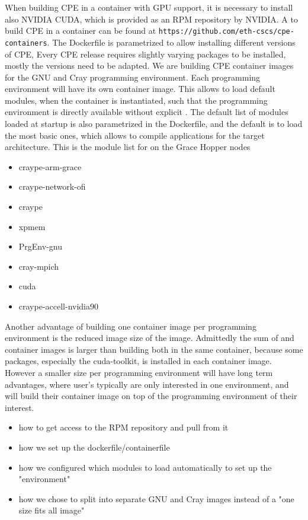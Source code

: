 When building CPE in a container with GPU support, it is necessary to install also NVIDIA CUDA, which is provided as an RPM repository by NVIDIA.
A  to build CPE in a container can be found at \lstinline{https://github.com/eth-cscs/cpe-containers}. The Dockerfile is parametrized to allow installing different versions of CPE,
Every CPE release requires slightly varying packages to be installed, mostly the versions need to be adapted.
We are building CPE container images for the GNU and Cray programming environment.
Each programming environment will have its own container image.
This allows to load default modules, when the container is instantiated, such that the programming environment is directly available without explicit .
The default list of modules loaded at startup is also parametrized in the Dockerfile, and the default is to load the most basic ones, which allows to compile applications for the target architecture. This is the module list for  on the Grace Hopper nodes
\begin{itemize}
    \item craype-arm-grace
    \item craype-network-ofi
    \item craype
    \item xpmem
    \item PrgEnv-gnu
    \item cray-mpich
    \item cuda
    \item craype-accell-nvidia90
\end{itemize}
Another advantage of building one container image per programming environment is the reduced image size of the image.
Admittedly the sum of  and  container images is larger than building both in the same container, because some packages, especially the cuda-toolkit, is installed in each container image.
However a smaller size per programming environment will have long term advantages, where user's typically are only interested in one environment, and will build their container image on top of the programming environment of their interest.


\begin{itemize}
    \item how to get access to the RPM repository and pull from it
    \item how we set up the dockerfile/containerfile
    \item how we configured which modules to load automatically to set up the "environment"
    \item how we chose to split into separate GNU and Cray images instead of a "one size fits all image"
\end{itemize}

